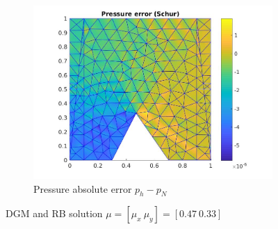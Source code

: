 \documentclass[graybox]{svmult}
\begin{document}
\begin{figure}[H]
\begin{subfigure}{0.31\textwidth}
\includegraphics[width=\linewidth]{pressure_error_at_47_33.jpg}
\caption{Pressure absolute error $p_h-p_N$} \label{pre_error}
\end{subfigure}
\caption{DGM and RB solution $\mu = [\mu_x \ \mu_y] = [0.47 \ 0.33]$} 
\label{dg_rb_solution_47_33}
\end{figure}
\end{document}
